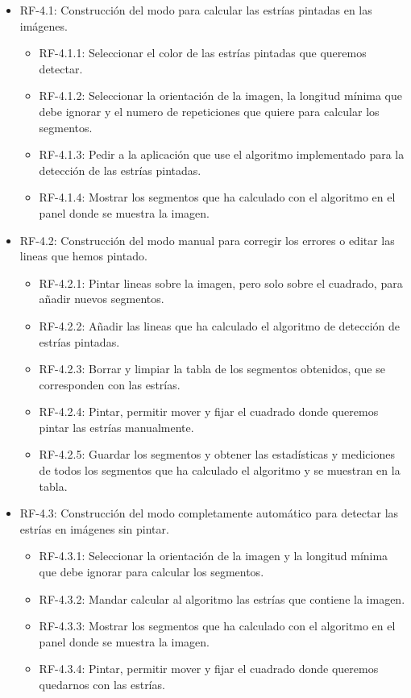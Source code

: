 \begin{itemize}
	
\item RF-4.1: Construcción del modo para calcular las estrías pintadas en las imágenes.
	\begin{itemize}
		\item RF-4.1.1: Seleccionar el color de las estrías pintadas que queremos detectar.
		\item RF-4.1.2: Seleccionar la orientación de la imagen, la longitud mínima que debe ignorar y el numero de repeticiones que quiere para calcular los segmentos.
		\item RF-4.1.3: Pedir a la aplicación que use el algoritmo implementado para la detección de las estrías pintadas.			 
		\item RF-4.1.4: Mostrar los segmentos que ha calculado con el algoritmo en el panel donde se muestra la imagen.
	\end{itemize}

\item RF-4.2: Construcción del modo manual para corregir los errores o editar las lineas que hemos pintado.
	\begin{itemize}
		\item RF-4.2.1: Pintar lineas sobre la imagen, pero solo sobre el cuadrado, para añadir nuevos segmentos.
		\item RF-4.2.2: Añadir las lineas que ha calculado el algoritmo de detección de estrías pintadas.
		\item RF-4.2.3: Borrar y limpiar la tabla de los segmentos obtenidos, que se corresponden con las estrías.
		\item RF-4.2.4: Pintar, permitir mover y fijar el cuadrado donde queremos pintar las estrías manualmente.
		\item RF-4.2.5: Guardar los segmentos y obtener las estadísticas y mediciones de todos los segmentos que ha calculado el algoritmo y se muestran en la tabla.			
	\end{itemize}
			 
\item RF-4.3: Construcción del modo completamente automático para detectar las estrías en imágenes sin pintar.
	\begin{itemize}
		\item RF-4.3.1: Seleccionar la orientación de la imagen y la longitud mínima que debe ignorar para calcular los segmentos. 
		\item RF-4.3.2: Mandar calcular al algoritmo las estrías que contiene la imagen.
		\item RF-4.3.3: Mostrar los segmentos que ha calculado con el algoritmo en el panel donde se muestra la imagen.					
		\item RF-4.3.4: Pintar, permitir mover y fijar el cuadrado donde queremos quedarnos con las estrías.
	\end{itemize}
\end{itemize}					

